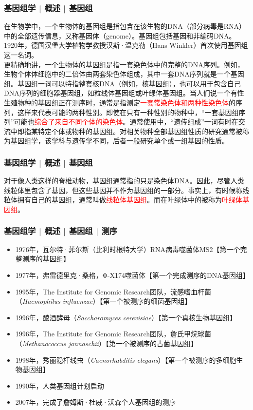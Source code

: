 \begin{frame}
  \frametitle{基因组学 | 概述 | 基因组}
在生物学中，一个生物体的基因组是指包含在该生物的DNA（部分病毒是RNA）中的全部遗传信息，又称基因体（genome）。基因组包括基因和非编码DNA。1920年，德国汉堡大学植物学教授汉斯·温克勒（Hans Winkler）首次使用基因组这一名词。\\
\vspace{1em}
更精确地讲，一个生物体的基因组是指一套染色体中的完整的DNA序列。例如，生物个体体细胞中的二倍体由两套染色体组成，其中一套DNA序列就是一个基因组。基因组一词可以特指整套核DNA（例如，核基因组），也可以用于包含自己DNA序列的细胞器基因组，如粒线体基因组或叶绿体基因组。当人们说一个有性生殖物种的基因组正在测序时，通常是指测定\textcolor{red}{一套常染色体和两种性染色体}的序列，这样来代表可能的两种性别。即使在只有一种性别的物种中，“一套基因组序列”可能也\textcolor{red}{综合了来自不同个体的染色体}。通常使用中，“遗传组成”一词有时在交流中即指某特定个体或物种的基因组。对相关物种全部基因组性质的研究通常被称为基因组学，该学科与遗传学不同，后者一般研究单个或一组基因的性质。
\end{frame}

\begin{frame}
  \frametitle{基因组学 | 概述 | 基因组}
对于像人类这样的脊椎动物，基因组通常指的只是染色体DNA。因此，尽管人类线粒体里包含了基因，但这些基因并不作为基因组的一部分。事实上，有时候称线粒体拥有自己的基因组，通常叫做\textcolor{red}{线粒体基因组}。而在叶绿体中的被称为\textcolor{red}{叶绿体基因组}。
\end{frame}

\begin{frame}
  \frametitle{基因组学 | 概述 | 基因组 | 测序}
  \begin{itemize}[<+->]
    \item 1976年，瓦尔特·菲尔斯（比利时根特大学）RNA病毒噬菌体MS2【第一个完整测序的基因组】
    \item 1977年，弗雷德里克·桑格，Φ-X174噬菌体【第一个完成测序的DNA基因组】
    \item 1995年，The Institute for Genomic Research团队，流感嗜血杆菌（\textit{Haemophilus influenzae}）【第一个被测序的细菌基因组】
    \item 1996年，酿酒酵母（\textit{Saccharomyces cerevisiae}）【第一个真核生物基因组】
    \item 1996年，The Institute for Genomic Research团队，詹氏甲烷球菌（\textit{Methanococcus jannaschii}）【第一个被测序的古菌基因组】
    \item 1998年，秀丽隐杆线虫（\textit{Caenorhabditis elegans}）【第一个被测序的多细胞生物基因组】
    \item 1990年，人类基因组计划启动
    \item 2007年，完成了詹姆斯·杜威·沃森个人基因组的测序
  \end{itemize}
\end{frame}

